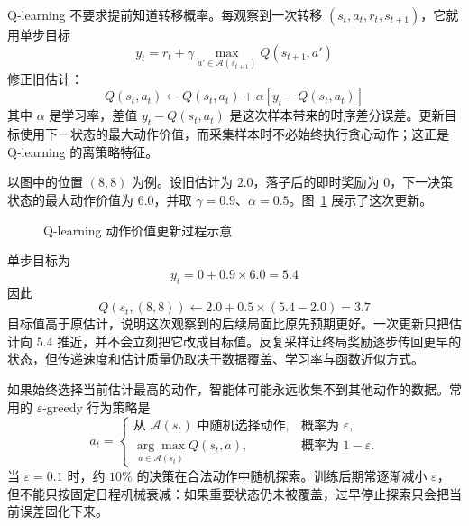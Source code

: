 \documentclass[UTF8,a4paper,zihao=-4,oneside,openany]{ctexbook}
\begin{document}
Q-learning 不要求提前知道转移概率。每观察到一次转移 $(s_t,a_t,r_t,s_{t+1})$，它就用单步目标
\begin{equation}
y_t=r_t+\gamma\max_{a'\in\mathcal A(s_{t+1})}Q(s_{t+1},a')
\end{equation}
修正旧估计：
\begin{equation}
Q(s_t,a_t)
\leftarrow
Q(s_t,a_t)
+\alpha\left[y_t-Q(s_t,a_t)\right]
\end{equation}
其中 $\alpha$ 是学习率，差值 $y_t-Q(s_t,a_t)$ 是这次样本带来的时序差分误差。更新目标使用下一状态的最大动作价值，而采集样本时不必始终执行贪心动作；这正是 Q-learning 的离策略特征。

以图中的位置 $(8,8)$ 为例。设旧估计为 $2.0$，落子后的即时奖励为 $0$，下一决策状态的最大动作价值为 $6.0$，并取 $\gamma=0.9$、$\alpha=0.5$。图~\ref{fig:q_learning_update} 展示了这次更新。

\begin{figure}[htbp]
  \centering
  \caption{Q-learning 动作价值更新过程示意}
  \label{fig:q_learning_update}
\end{figure}

单步目标为
\begin{equation}
y_t=0+0.9\times6.0=5.4
\end{equation}
因此
\begin{equation}
Q(s_t,(8,8))
\leftarrow
2.0+0.5\times(5.4-2.0)
=3.7
\end{equation}
目标值高于原估计，说明这次观察到的后续局面比原先预期更好。一次更新只把估计向 $5.4$ 推近，并不会立刻把它改成目标值。反复采样让终局奖励逐步传回更早的状态，但传递速度和估计质量仍取决于数据覆盖、学习率与函数近似方式。

如果始终选择当前估计最高的动作，智能体可能永远收集不到其他动作的数据。常用的 $\varepsilon$-greedy 行为策略是
\begin{equation}
a_t
=
\begin{cases}
\text{从 $\mathcal{A}(s_t)$ 中随机选择动作}, & \text{概率为 }\varepsilon,\\
\displaystyle
\underset{a\in\mathcal{A}(s_t)}{\arg\max}Q(s_t,a),
& \text{概率为 }1-\varepsilon.
\end{cases}
\end{equation}
当 $\varepsilon=0.1$ 时，约 $10\%$ 的决策在合法动作中随机探索。训练后期常逐渐减小 $\varepsilon$，但不能只按固定日程机械衰减：如果重要状态仍未被覆盖，过早停止探索只会把当前误差固化下来。
\end{document}
